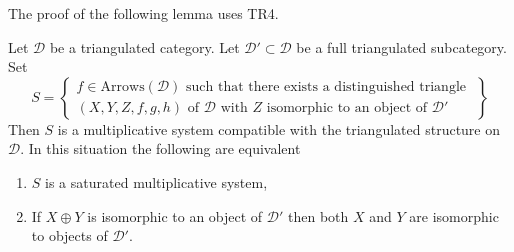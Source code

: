 \noindent
The proof of the following lemma uses TR4.

\begin{lemma}
\label{lemma-construct-multiplicative-system}
Let $\mathcal{D}$ be a triangulated category.
Let $\mathcal{D}' \subset \mathcal{D}$ be a full triangulated
subcategory. Set
\begin{equation}
\label{equation-multiplicative-system}
S =
\left\{
\begin{matrix}
f \in \text{Arrows}(\mathcal{D})
\text{ such that there exists a distinguished triangle }\\
(X, Y, Z, f, g, h) \text{ of }\mathcal{D}\text{ with }
Z\text{ isomorphic to an object of }\mathcal{D}'
\end{matrix}
\right\}
\end{equation}
Then $S$ is a multiplicative system compatible with the triangulated
structure on $\mathcal{D}$. In this situation the following are equivalent
\begin{enumerate}
\item $S$ is a saturated multiplicative system,
\item If $X \oplus Y$ is isomorphic to an object of $\mathcal{D}'$
then both $X$ and $Y$ are isomorphic to objects of $\mathcal{D}'$.
\end{enumerate}
\end{lemma}

